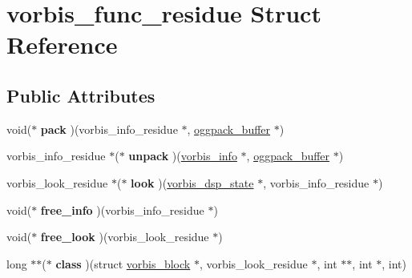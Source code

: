 \hypertarget{structvorbis__func__residue}{\section{vorbis\+\_\+func\+\_\+residue Struct Reference}
\label{structvorbis__func__residue}
}
\subsection*{Public Attributes}
\begin{DoxyCompactItemize}
\item 
\hypertarget{structvorbis__func__residue_a48c096eb7dbfde0793a805d64d034e72}{void($\ast$ {\bfseries pack} )(vorbis\+\_\+info\+\_\+residue $\ast$, \hyperlink{structoggpack__buffer}{oggpack\+\_\+buffer} $\ast$)}\label{structvorbis__func__residue_a48c096eb7dbfde0793a805d64d034e72}

\item 
\hypertarget{structvorbis__func__residue_a98e1db30e8a21df7ef41dba94976e924}{vorbis\+\_\+info\+\_\+residue $\ast$($\ast$ {\bfseries unpack} )(\hyperlink{structvorbis__info}{vorbis\+\_\+info} $\ast$, \hyperlink{structoggpack__buffer}{oggpack\+\_\+buffer} $\ast$)}\label{structvorbis__func__residue_a98e1db30e8a21df7ef41dba94976e924}

\item 
\hypertarget{structvorbis__func__residue_a65fac704a6b71e218cb1b9f6fcdf08c7}{vorbis\+\_\+look\+\_\+residue $\ast$($\ast$ {\bfseries look} )(\hyperlink{structvorbis__dsp__state}{vorbis\+\_\+dsp\+\_\+state} $\ast$, vorbis\+\_\+info\+\_\+residue $\ast$)}\label{structvorbis__func__residue_a65fac704a6b71e218cb1b9f6fcdf08c7}

\item 
\hypertarget{structvorbis__func__residue_a6930c0015bd13248b552141f10c5bac3}{void($\ast$ {\bfseries free\+\_\+info} )(vorbis\+\_\+info\+\_\+residue $\ast$)}\label{structvorbis__func__residue_a6930c0015bd13248b552141f10c5bac3}

\item 
\hypertarget{structvorbis__func__residue_a365cfc5b4550d066a5ca5dfe4028421e}{void($\ast$ {\bfseries free\+\_\+look} )(vorbis\+\_\+look\+\_\+residue $\ast$)}\label{structvorbis__func__residue_a365cfc5b4550d066a5ca5dfe4028421e}

\item 
\hypertarget{structvorbis__func__residue_ad6a2241321b68583399c717c4cbdc67b}{long $\ast$$\ast$($\ast$ {\bfseries class} )(struct \hyperlink{structvorbis__block}{vorbis\+\_\+block} $\ast$, vorbis\+\_\+look\+\_\+residue $\ast$, int $\ast$$\ast$, int $\ast$, int)}\label{structvorbis__func__residue_ad6a2241321b68583399c717c4cbdc67b}


\end{DoxyCompactItemize}
